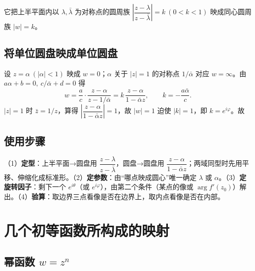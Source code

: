 
它把上半平面内以 \(\lambda,\bar\lambda\) 为对称点的圆周族 \(\left|\dfrac{z-\lambda}{z-\bar\lambda}\right|=k\ (0<k<1)\) 映成同心圆周族 \(|w|=k\)。

\subsection{将单位圆盘映成单位圆盘}

设 \(z=\alpha\ (|\alpha|<1)\) 映成 \(w=0\)；\(\alpha\) 关于 \(|z|=1\) 的对称点 \(1/\bar\alpha\) 对应 \(w=\infty\)。由 \(a\alpha+b=0,\ c/\bar\alpha+d=0\) 得
\[
w=\frac{a}{c}\cdot\frac{z-\alpha}{z-1/\bar\alpha}
=k\,\frac{z-\alpha}{1-\bar\alpha z},\qquad k=-\frac{a\bar\alpha}{c}.
\]
\(|z|=1\) 时 \(\bar z=1/z\)，算得 \(\left|\dfrac{z-\alpha}{1-\bar\alpha z}\right|=1\)，故 \(|w|=1\) 迫使 \(|k|=1\)，即 \(k=e^{i\varphi}\)。故


\subsection{使用步骤}

（1）\textbf{定型}：上半平面→圆盘用 \(\dfrac{z-\lambda}{z-\bar\lambda}\)，圆盘→圆盘用 \(\dfrac{z-\alpha}{1-\bar\alpha z}\)；两域同型时先用平移、伸缩化成标准形。（2）\textbf{定参数}：由“哪点映成圆心”唯一确定 \(\lambda\) 或 \(\alpha\)。（3）\textbf{定旋转因子}：剩下一个 \(e^{i\theta}\)（或 \(e^{i\varphi}\)），由第二个条件（某点的像或 \(\arg f'(z_{0})\)）解出。（4）\textbf{验算}：取边界三点看像是否在边界上，取内点看像是否在内部。


\section{几个初等函数所构成的映射}

\subsection{幂函数 \(w=z^{n}\)}


